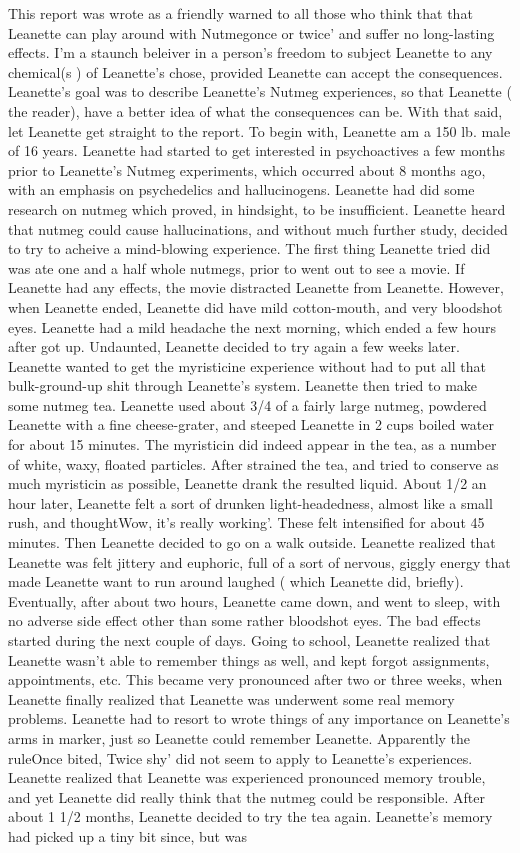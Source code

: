 \documentclass[12pt]{book}
\begin{document}
This report was wrote as a friendly warned to all those who think that that Leanette can play around with Nutmegonce or twice' and suffer no long-lasting effects. I'm a staunch beleiver in a person's freedom to subject Leanette to any chemical(s ) of Leanette's chose, provided Leanette can accept the consequences. Leanette's goal was to describe Leanette's Nutmeg experiences, so that Leanette ( the reader), have a better idea of what the consequences can be. With that said, let Leanette get straight to the report. To begin with, Leanette am a 150 lb. male of 16 years. Leanette had started to get interested in psychoactives a few months prior to Leanette's Nutmeg experiments, which occurred about 8 months ago, with an emphasis on psychedelics and hallucinogens. Leanette had did some research on nutmeg which proved, in hindsight, to be insufficient. Leanette heard that nutmeg could cause hallucinations, and without much further study, decided to try to acheive a mind-blowing experience. The first thing Leanette tried did was ate one and a half whole nutmegs, prior to went out to see a movie. If Leanette had any effects, the movie distracted Leanette from Leanette. However, when Leanette ended, Leanette did have mild cotton-mouth, and very bloodshot eyes. Leanette had a mild headache the next morning, which ended a few hours after got up. Undaunted, Leanette decided to try again a few weeks later. Leanette wanted to get the myristicine experience without had to put all that bulk-ground-up shit through Leanette's system. Leanette then tried to make some nutmeg tea. Leanette used about 3/4 of a fairly large nutmeg, powdered Leanette with a fine cheese-grater, and steeped Leanette in 2 cups boiled water for about 15 minutes. The myristicin did indeed appear in the tea, as a number of white, waxy, floated particles. After strained the tea, and tried to conserve as much myristicin as possible, Leanette drank the resulted liquid. About 1/2 an hour later, Leanette felt a sort of drunken light-headedness, almost like a small rush, and thoughtWow, it's really working'. These felt intensified for about 45 minutes. Then Leanette decided to go on a walk outside. Leanette realized that Leanette was felt jittery and euphoric, full of a sort of nervous, giggly energy that made Leanette want to run around laughed ( which Leanette did, briefly). Eventually, after about two hours, Leanette came down, and went to sleep, with no adverse side effect other than some rather bloodshot eyes. The bad effects started during the next couple of days. Going to school, Leanette realized that Leanette wasn't able to remember things as well, and kept forgot assignments, appointments, etc. This became very pronounced after two or three weeks, when Leanette finally realized that Leanette was underwent some real memory problems. Leanette had to resort to wrote things of any importance on Leanette's arms in marker, just so Leanette could remember Leanette. Apparently the ruleOnce bited, Twice shy' did not seem to apply to Leanette's experiences. Leanette realized that Leanette was experienced pronounced memory trouble, and yet Leanette did really think that the nutmeg could be responsible. After about 1 1/2 months, Leanette decided to try the tea again. Leanette's memory had picked up a tiny bit since, but was 
\end{document}
